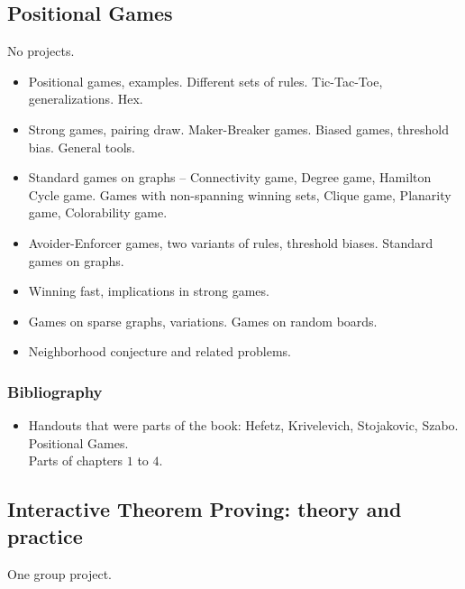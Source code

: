 \documentclass[spanish]{article}
\begin{document}
\hrulefill%

\subsection{Positional Games}
No projects.

\begin{itemize}
  \item
Positional games, examples. Different sets of rules. Tic-Tac-Toe, generalizations. Hex.
  \item
Strong games, pairing draw. Maker-Breaker games. Biased games, threshold bias. General tools.
  \item
Standard games on graphs – Connectivity game, Degree game, Hamilton Cycle game. Games with non-spanning winning sets, Clique game, Planarity game, Colorability game.
  \item
Avoider-Enforcer games, two variants of rules, threshold biases. Standard games on graphs.
  \item
Winning fast, implications in strong games.
  \item
Games on sparse graphs, variations. Games on random boards.
  \item
Neighborhood conjecture and related problems.
\end{itemize}

\subsubsection{Bibliography}
\begin{itemize}
  \item Handouts that were parts of the book: Hefetz, Krivelevich, Stojakovic, Szabo. Positional Games.\\
    Parts of chapters $1$ to $4$.
\end{itemize}

\hrulefill%

\subsection{Interactive Theorem Proving: theory and practice}
One group project.
\end{document}
